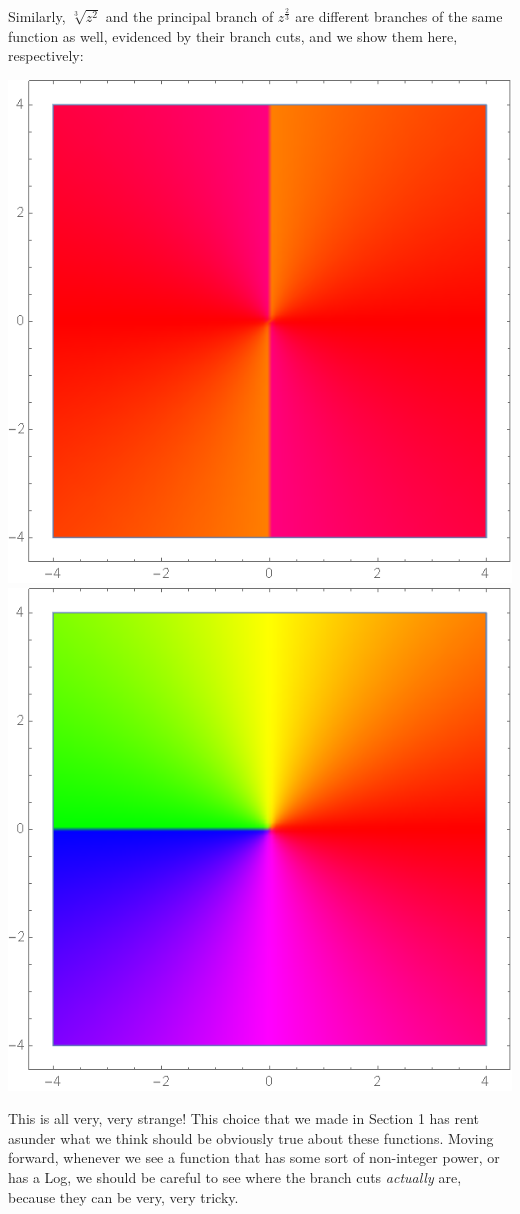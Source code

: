 Similarly, $\sqrt[3]{z^2}$ and the principal branch of $z^{\frac{2}{3}}$ are different branches of the same function as well, evidenced by their branch cuts, and we show them here, respectively:
\begin{center}
    \includegraphics[scale=0.27]{images/cbrtzsqr1.png}
    \includegraphics[scale=0.27]{images/cbrtzsqr2.png}
\end{center}
This is all very, very strange! This choice that we made in Section 1 has rent asunder what we think should be obviously true about these functions. Moving forward, whenever we see a function that has some sort of non-integer power, or has a Log, we should be careful to see where the branch cuts \textit{actually} are, because they can be very, very tricky.

